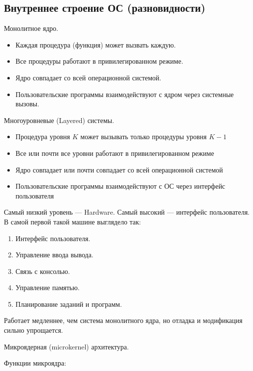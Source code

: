 \documentclass[12pt, a4paper]{article}
\begin{document}
    \subsection*{Внутреннее строение ОС (разновидности)}
    \begin{center}
        Монолитное ядро.
    \end{center}
    \begin{itemize}
        \item Каждая процедура (функция) может вызвать каждую.
        \item Все процедуры работают в привилегированном режиме.
        \item Ядро совпадает со всей операционной системой.
        \item Пользовательские программы взаимодействуют с ядром через системные вызовы.
    \end{itemize}
    \begin{center}
        Многоуровневые (Layered) системы.
    \end{center}
    \begin{itemize}
        \item Процедура уровня $K$ может вызывать только процедуры уровня $K-1$
        \item Все или почти все уровни работают в привилегированном режиме
        \item Ядро совпадает или почти совпадает со всей операционной системой
        \item Пользовательские программы взаимодействуют с ОС через интерфейс пользователя
    \end{itemize}
     Самый низкий уровень --- Hardware. Самый высокий --- интерфейс пользователя.
    В самой первой такой машине выглядело так:
    \begin{enumerate}
        \item Интерфейс пользователя.
        \item Управление ввода вывода.
        \item Связь с консолью.
        \item Управление памятью.
        \item Планирование заданий и программ.
    \end{enumerate}
     Работает медленнее, чем система монолитного ядра, но отладка и модификация сильно упрощается.
    \begin{center}
        Микроядерная (microkernel) архитектура.
    \end{center}
    Функции микроядра:
\end{document}
